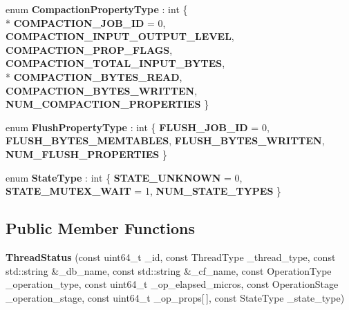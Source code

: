\begin{DoxyCompactItemize}
\item 
enum {\bfseries Compaction\+Property\+Type} \+: int \{ \\*
{\bfseries C\+O\+M\+P\+A\+C\+T\+I\+O\+N\+\_\+\+J\+O\+B\+\_\+\+ID} = 0, 
{\bfseries C\+O\+M\+P\+A\+C\+T\+I\+O\+N\+\_\+\+I\+N\+P\+U\+T\+\_\+\+O\+U\+T\+P\+U\+T\+\_\+\+L\+E\+V\+EL}, 
{\bfseries C\+O\+M\+P\+A\+C\+T\+I\+O\+N\+\_\+\+P\+R\+O\+P\+\_\+\+F\+L\+A\+GS}, 
{\bfseries C\+O\+M\+P\+A\+C\+T\+I\+O\+N\+\_\+\+T\+O\+T\+A\+L\+\_\+\+I\+N\+P\+U\+T\+\_\+\+B\+Y\+T\+ES}, 
\\*
{\bfseries C\+O\+M\+P\+A\+C\+T\+I\+O\+N\+\_\+\+B\+Y\+T\+E\+S\+\_\+\+R\+E\+AD}, 
{\bfseries C\+O\+M\+P\+A\+C\+T\+I\+O\+N\+\_\+\+B\+Y\+T\+E\+S\+\_\+\+W\+R\+I\+T\+T\+EN}, 
{\bfseries N\+U\+M\+\_\+\+C\+O\+M\+P\+A\+C\+T\+I\+O\+N\+\_\+\+P\+R\+O\+P\+E\+R\+T\+I\+ES}
 \}\hypertarget{structrocksdb_1_1ThreadStatus_ad30ba9f65e9a459383e62e26c95dc25d}{}\label{structrocksdb_1_1ThreadStatus_ad30ba9f65e9a459383e62e26c95dc25d}

\item 
enum {\bfseries Flush\+Property\+Type} \+: int \{ {\bfseries F\+L\+U\+S\+H\+\_\+\+J\+O\+B\+\_\+\+ID} = 0, 
{\bfseries F\+L\+U\+S\+H\+\_\+\+B\+Y\+T\+E\+S\+\_\+\+M\+E\+M\+T\+A\+B\+L\+ES}, 
{\bfseries F\+L\+U\+S\+H\+\_\+\+B\+Y\+T\+E\+S\+\_\+\+W\+R\+I\+T\+T\+EN}, 
{\bfseries N\+U\+M\+\_\+\+F\+L\+U\+S\+H\+\_\+\+P\+R\+O\+P\+E\+R\+T\+I\+ES}
 \}\hypertarget{structrocksdb_1_1ThreadStatus_acede81055e976298329dc3ab8bb4b570}{}\label{structrocksdb_1_1ThreadStatus_acede81055e976298329dc3ab8bb4b570}

\item 
enum {\bfseries State\+Type} \+: int \{ {\bfseries S\+T\+A\+T\+E\+\_\+\+U\+N\+K\+N\+O\+WN} = 0, 
{\bfseries S\+T\+A\+T\+E\+\_\+\+M\+U\+T\+E\+X\+\_\+\+W\+A\+IT} = 1, 
{\bfseries N\+U\+M\+\_\+\+S\+T\+A\+T\+E\+\_\+\+T\+Y\+P\+ES}
 \}\hypertarget{structrocksdb_1_1ThreadStatus_a740fdb40adbee04944b43b302ad4a18a}{}\label{structrocksdb_1_1ThreadStatus_a740fdb40adbee04944b43b302ad4a18a}

\end{DoxyCompactItemize}
\subsection*{Public Member Functions}
\begin{DoxyCompactItemize}
\item 
{\bfseries Thread\+Status} (const uint64\+\_\+t \+\_\+id, const Thread\+Type \+\_\+thread\+\_\+type, const std\+::string \&\+\_\+db\+\_\+name, const std\+::string \&\+\_\+cf\+\_\+name, const Operation\+Type \+\_\+operation\+\_\+type, const uint64\+\_\+t \+\_\+op\+\_\+elapsed\+\_\+micros, const Operation\+Stage \+\_\+operation\+\_\+stage, const uint64\+\_\+t \+\_\+op\+\_\+props\mbox{[}$\,$\mbox{]}, const State\+Type \+\_\+state\+\_\+type)\hypertarget{structrocksdb_1_1ThreadStatus_aa83828fa8e91b207cff2ec55ed668eef}{}\label{structrocksdb_1_1ThreadStatus_aa83828fa8e91b207cff2ec55ed668eef}

\end{DoxyCompactItemize}
